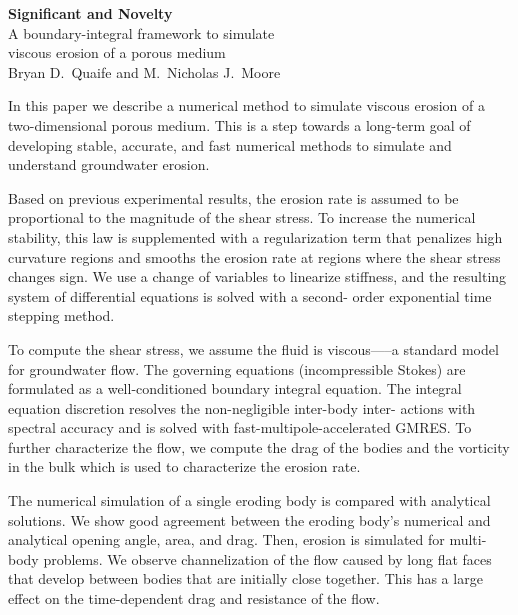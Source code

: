 \documentclass[11pt]{article}
\begin{document}
\begin{center}
  {\bf Significant and Novelty} \\
  A boundary-integral framework to simulate \\ viscous erosion of a
  porous medium \\
  Bryan D.~Quaife and M.~Nicholas J.~Moore
\end{center}

In this paper we describe a numerical method to simulate viscous erosion
of a two-dimensional porous medium. This is a step towards a long-term
goal of developing stable, accurate, and fast numerical methods to
simulate and understand groundwater erosion.

Based on previous experimental results, the erosion rate is assumed to
be proportional to the magnitude of the shear stress. To increase the
numerical stability, this law is supplemented with a regularization term
that penalizes high curvature regions and smooths the erosion rate at
regions where the shear stress changes sign. We use a change of
variables to linearize stiffness, and the resulting system of
differential equations is solved with a second- order exponential time
stepping method.

To compute the shear stress, we assume the fluid is viscous—--a standard
model for groundwater flow. The governing equations (incompressible
Stokes) are formulated as a well-conditioned boundary integral equation.
The integral equation discretion resolves the non-negligible inter-body
inter- actions with spectral accuracy and is solved with
fast-multipole-accelerated GMRES. To further characterize the flow, we
compute the drag of the bodies and the vorticity in the bulk which is
used to characterize the erosion rate.

The numerical simulation of a single eroding body is compared with
analytical solutions. We show good agreement between the eroding body's
numerical and analytical opening angle, area, and drag. Then, erosion is
simulated for multi-body problems. We observe channelization of the flow
caused by long flat faces that develop between bodies that are initially
close together. This has a large effect on the time-dependent drag and
resistance of the flow.
\end{document}

